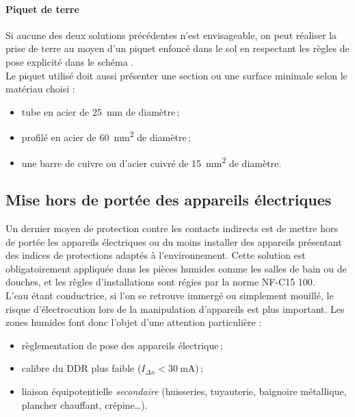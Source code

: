 \paragraph{Piquet de terre}
Si aucune des deux solutions précédentes n'est envisageable, on peut réaliser la prise de terre au moyen d'un piquet enfoncé dans le sol en respectant les règles de pose explicité dans le schéma .\\
Le piquet utilisé doit aussi présenter une section ou une surface minimale selon le matériau choisi :
\begin{itemize}
\item tube en acier de \SI{25}{\milli\meter} de diamètre\,;
\item profilé en acier de \SI{60}{\square\milli\meter} de diamètre\,;
\item une barre de cuivre ou d'acier cuivré de \SI{15}{\square\milli\meter} de diamètre.
\end{itemize}



\subsection{Mise hors de portée des appareils électriques}

Un dernier moyen de protection contre les contacts indirects est de mettre hors de portée les appareils électriques ou du moins installer des appareils présentant des indices de protections adaptés à l'environnement. Cette solution est obligatoirement appliquée dans les pièces humides comme les salles de bain ou de douches, et les règles d'installations sont régies par la norme NF-C15 100\supercite{NF:C15-100-2015}.\\
L'eau étant conductrice, si l'on se retrouve immergé ou simplement mouillé, le risque d'électrocution lors de la manipulation d'appareils est plus important. Les zones humides font donc l'objet d'une attention particulière :
\begin{itemize}
\item règlementation de pose des appareils électrique\,;
\item calibre du DDR plus faible ($I_{\Delta n}<\SI{30}{\milli\ampere}$)\,;
\item liaison équipotentielle \emph{secondaire} (huisseries, tuyauterie, baignoire métallique, plancher chauffant, crépine\ldots).
\end{itemize}




